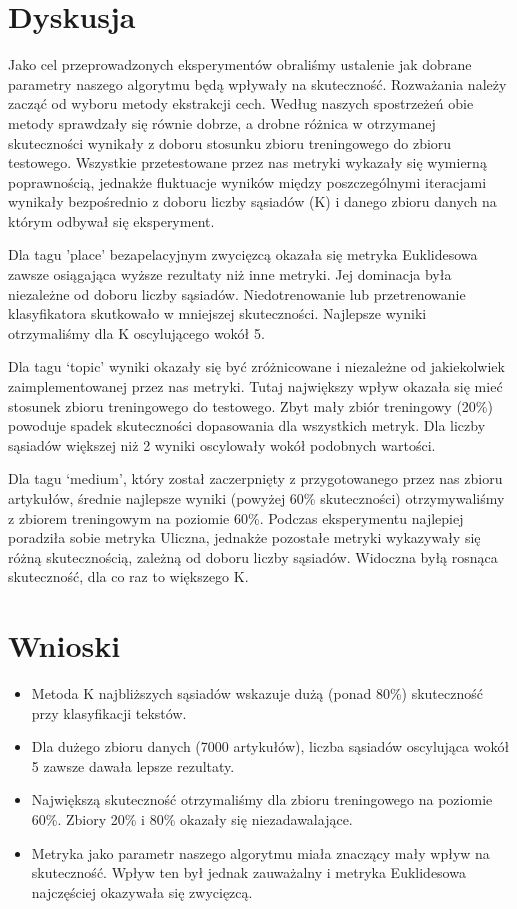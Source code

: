 \documentclass{classrep}
\begin{document}
\section{Dyskusja}

Jako cel przeprowadzonych eksperymentów obraliśmy ustalenie jak dobrane parametry naszego algorytmu będą wpływały na skuteczność. 
Rozważania należy zacząć od wyboru metody ekstrakcji cech. Według naszych spostrzeżeń obie metody sprawdzały się równie dobrze, a drobne różnica w otrzymanej skuteczności wynikały z doboru stosunku zbioru treningowego do zbioru testowego. Wszystkie przetestowane przez nas metryki wykazały się wymierną poprawnością, jednakże fluktuacje wyników między poszczególnymi iteracjami wynikały bezpośrednio z doboru liczby sąsiadów (K) i danego zbioru danych na którym odbywał się eksperyment. \newline

Dla tagu 'place' bezapelacyjnym zwycięzcą okazała się metryka Euklidesowa zawsze osiągająca wyższe rezultaty niż inne metryki. Jej dominacja była niezależne od doboru liczby sąsiadów. Niedotrenowanie lub przetrenowanie klasyfikatora skutkowało w mniejszej skuteczności. Najlepsze wyniki otrzymaliśmy dla K oscylującego wokół 5.\newline

Dla tagu `topic' wyniki okazały się być zróżnicowane i niezależne od jakiekolwiek zaimplementowanej przez nas metryki. Tutaj największy wpływ okazała się mieć stosunek zbioru treningowego do testowego. Zbyt mały zbiór treningowy (20\%) powoduje spadek skuteczności dopasowania dla wszystkich metryk.
Dla liczby sąsiadów większej niż 2 wyniki oscylowały wokół podobnych wartości.\newline

Dla tagu `medium', który został zaczerpnięty z przygotowanego przez nas zbioru artykułów, średnie najlepsze wyniki (powyżej 60\% skuteczności) otrzymywaliśmy z zbiorem treningowym na poziomie 60\%. Podczas eksperymentu najlepiej poradziła sobie metryka Uliczna, jednakże pozostałe metryki wykazywały się różną skutecznością, zależną od doboru liczby sąsiadów. Widoczna byłą rosnąca skuteczność, dla co raz to większego K. 

\section{Wnioski}
\begin{itemize}
\item Metoda K najbliższych sąsiadów wskazuje dużą (ponad 80\%) skuteczność przy klasyfikacji tekstów.
\item Dla dużego zbioru danych (7000 artykułów), liczba sąsiadów oscylująca wokół 5 zawsze dawała lepsze rezultaty.
\item Największą skuteczność otrzymaliśmy dla zbioru treningowego na poziomie 60\%. Zbiory 20\% i 80\% okazały się niezadawalające. 
\item Metryka jako parametr naszego algorytmu miała znaczący mały wpływ na skuteczność. Wpływ ten był jednak zauważalny i metryka Euklidesowa najczęściej okazywała się zwycięzcą. 
\end{itemize}
\end{document}

